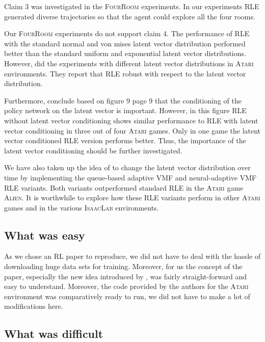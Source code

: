 \documentclass[10pt]{article} %
\begin{document}
Claim 3 was investigated in the \textsc{FourRoom} experiments. In our experiments \textsc{RLE} generated diverse trajectories so that the agent could explore all the four rooms.

Our \textsc{FourRoom} experiments do not support claim 4. The performance of \textsc{RLE} with the standard normal and von mises latent vector distribution performed better than the standard uniform and exponential latent vector distributions. However, \cite{rle-paper} did the experiments with different latent vector distributions in \textsc{Atari} environments. They report that \textsc{RLE} robust with respect to the latent vector distribution.

Furthermore, \cite{rle-paper} conclude based on figure 9 page 9 that the conditioning of the policy network on the latent vector is important. However, in this figure \textsc{RLE} without latent vector conditioning shows similar performance to \textsc{RLE} with latent vector conditioning in three out of four \textsc{Atari} games. Only in one game the latent vector conditioned \textsc{RLE} version performs better. Thus, the importance of the latent vector conditioning should be further investigated.

We have also taken up the idea of \cite{rle-paper} to change the latent vector distribution over time by implementing the queue-based adaptive VMF and neural-adaptive VMF \textsc{RLE} variants. Both variants outperformed standard \textsc{RLE} in the \textsc{Atari} game \textsc{Alien}. It is worthwhile to explore how these \textsc{RLE} variants perform in other \textsc{Atari} games and in the various \textsc{IsaacLab} environments.

\subsection{What was easy}

As we chose an RL paper to reproduce, we did not have to deal with the hassle of downloading huge data sets for training. Moreover, for us the concept of the paper, especially the new idea introduced by \cite{rle-paper}, was fairly straight-forward and easy to understand. Moreover, the code provided by the authors for the \textsc{Atari} environment was comparatively ready to run, we did not have to make a lot of modifications here.

\subsection{What was difficult}
\end{document}
